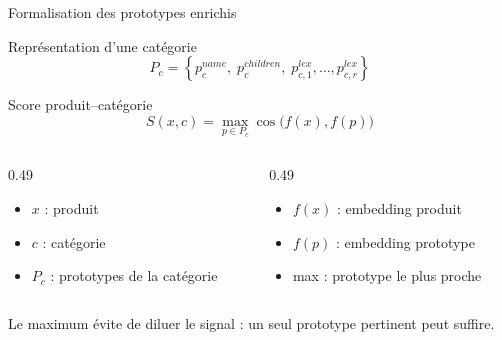 \documentclass[11pt,aspectratio=169]{beamer}
\begin{document}
\begin{frame}{Formalisation des prototypes enrichis}
\small
\begin{block}{Représentation d'une catégorie}
\[
P_c=
\left\{
p^{name}_c,\;
p^{children}_c,\;
p^{lex}_{c,1},\ldots,p^{lex}_{c,r}
\right\}
\]
\end{block}

\begin{block}{Score produit--catégorie}
\[
S(x,c)
=
\max_{p\in P_c}
\cos\big(f(x),f(p)\big)
\]
\end{block}

\begin{columns}
\begin{column}{0.49\textwidth}
\begin{itemize}
    \item \(x\) : produit
    \item \(c\) : catégorie
    \item \(P_c\) : prototypes de la catégorie
\end{itemize}
\end{column}

\begin{column}{0.49\textwidth}
\begin{itemize}
    \item \(f(x)\) : embedding produit
    \item \(f(p)\) : embedding prototype
    \item max : prototype le plus proche
\end{itemize}
\end{column}
\end{columns}

\vspace{0.2cm}

\begin{takeawaybox}
\centering
Le maximum évite de diluer le signal : un seul prototype pertinent peut suffire.
\end{takeawaybox}
\end{frame}
\end{document}
